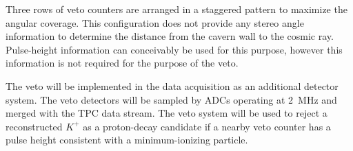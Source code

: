 Three rows of veto counters are arranged in a staggered pattern to maximize the angular coverage. This configuration does not provide any stereo angle information to determine the distance from the cavern wall to the cosmic ray. Pulse-height information can conceivably be used for this purpose, however this information is not required for the purpose of the veto.

The veto will be implemented in the data acquisition as an additional detector system. The veto detectors will be sampled by ADCs operating at 2~MHz and merged with the TPC data stream. The veto system will be used to reject a reconstructed $K^+$ as a proton-decay candidate if a nearby veto counter has a pulse height consistent with a minimum-ionizing particle.

